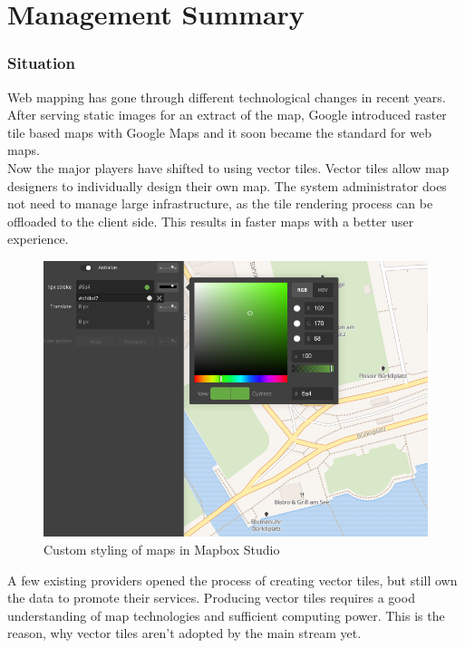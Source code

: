 
\begingroup
\let\clearpage\relax
\let\cleardoublepage\relax
\let\cleardoublepage\relax

\chapter*{Management Summary}
\label{management-summary}

\subsection*{Situation}\label{introduction}

Web mapping has gone through different technological changes in recent years. 
After serving static images for an extract of the map, Google introduced raster tile based maps with Google Maps and it soon became the standard for web maps.\\
Now the major players have shifted to using vector tiles. Vector tiles allow map designers to individually design their own map. The system administrator does not need to manage large infrastructure, as the tile rendering process can be offloaded to the client side. This results in faster maps with a better user experience.
\begin{figure}[H]
  \includegraphics[width=1\textwidth]{images/custom_map.png}
  \caption{Custom styling of maps in Mapbox Studio}
\end{figure}
A few existing providers opened the process of creating vector tiles, but still own the data to promote their services. Producing vector tiles requires a good understanding of map technologies and sufficient computing power. This is the reason, why vector tiles aren't adopted by the main stream yet.

